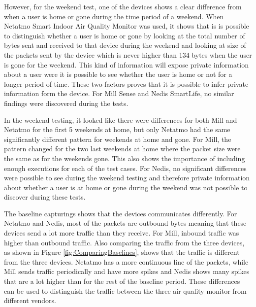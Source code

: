 However, for the weekend test, one of the devices shows a clear difference from when a user is home or gone during the time period of a weekend. When Netatmo Smart Indoor Air Quality Monitor was used, it shows that is is possible to distinguish whether a user is home or gone by looking at the total number of bytes sent and received to that device during the weekend and looking at size of the packets sent by the device which is never higher than 134 bytes when the user is gone for the weekend. This kind of information will expose private information about a user were it is possible to see whether the user is home or not for a longer period of time. These two factors proves that it is possible to infer private information form the device. For Mill Sense and Nedis SmartLife, no similar findings were discovered during the tests. 

In the weekend testing, it looked like there were differences for both Mill and Netatmo for the first 5 weekends at home, but only Netatmo had the same significantly different pattern for weekends at home and gone. For Mill, the pattern changed for the two last weekends at home where the packet size were the same as for the weekends gone. This also shows the importance of including enough executions for each of the test cases. For Nedis, no significant differences were possible to see during the weekend testing and therefore private information about whether a user is at home or gone during the weekend was not possible to discover during these tests. 

The baseline capturings shows that the devices communicates differently. For Netatmo and Nedis, most of the packets are outbound bytes meaning that these devices send a lot more traffic than they receive. For Mill, inbound traffic was higher than outbound traffic. Also comparing the traffic from the three devices, as shown in Figure \ref{fig:ComparingBaselines}, shows that the traffic is different from the three devices. Netatmo has a more continuous line of the packets, while Mill sends traffic periodically and have more spikes and Nedis shows many spikes that are a lot higher than for the rest of the baseline period. These differences can be used to distinguish the traffic between the three air quality monitor from different vendors. 

